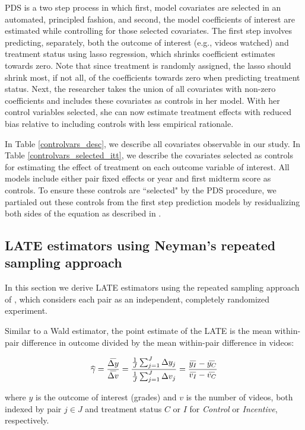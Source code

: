 \documentclass[12pt]{article}
\newcommand\wh[1]{\hstretch{2}{\hat{\hstretch{.5}{#1}}}}
\newcommand\wb[1]{\hstretch{2}{\bar{\hstretch{.5}{#1}}}}
\begin{document}
PDS is a two step process in which first, model covariates are selected in an automated, principled fashion, and second, the model coefficients of interest are estimated while controlling for those selected covariates. The first step involves predicting, separately, both the outcome of interest (e.g., videos watched) and treatment status using lasso regression, which shrinks coefficient estimates towards zero. Note that since treatment is randomly assigned, the lasso should shrink most, if not all, of the coefficients towards zero when predicting treatment status. Next, the researcher takes the union of all covariates with non-zero coefficients and includes these covariates as controls in her model. With her control variables selected, she can now estimate treatment effects with reduced bias relative to including controls with less empirical rationale.

In Table \ref{controlvars_desc}, we describe all covariates observable in our study. In Table \ref{controlvars_selected_itt}, we describe the covariates selected as controls for estimating the effect of treatment on each outcome variable of interest. All models include either pair fixed effects or year and first midterm score as controls. To ensure these controls are ``selected" by the PDS procedure, we partialed out these controls from the first step prediction models by residualizing both sides of the equation as described in \textcite{bch2014b}.

\subsection{LATE estimators using Neyman's repeated sampling approach} \label{a_neyman_late}

In this section we derive LATE estimators using the repeated sampling approach of \textcite{neyman1923}, which considers each pair as an independent, completely randomized experiment.

Similar to a Wald estimator, the point estimate of the LATE is the mean within-pair difference in outcome divided by the mean within-pair difference in videos:

\begin{equation} \label{neyman_late_spec}
	\wh{\gamma} = \frac{\wb{\Delta y}}{\wb{\Delta v}} = \frac{\frac{1}{J}\sum_{j=1}^{J} \Delta y_j }{\frac{1}{J}\sum_{j=1}^{J} \Delta v_j} = \frac{\wb{y_I} - \wb{y_C}}{\wb{v_I} - \wb{v_C}}
\end{equation}

where $y$ is the outcome of interest (grades) and $v$ is the number of videos, both indexed by pair $j\in J$ and treatment status $C$ or $I$ for \textit{Control} or \textit{Incentive}, respectively.
\end{document}
